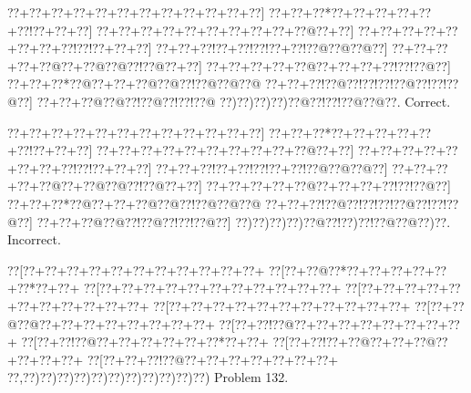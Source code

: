 \documentclass[a5paper]{article}
\begin{document}
\begin{center}
{\goo
\0??+\0??+\0??+\0??+\0??+\0??+\0??+\0??+\0??+\0??+\0??+\0??]
\0??+\0??+\0??*\0??+\0??+\0??+\0??+\0??+\0??!\0??+\0??+\0??]
\0??+\0??+\0??+\0??+\0??+\0??+\0??+\0??+\0??+\0??@\0??+\0??]
\0??+\0??+\0??+\0??+\0??+\0??+\0??+\0??!\0??!\0??+\0??+\0??]
\0??+\0??+\0??!\0??+\0??!\0??!\0??+\0??!\0??@\0??@\0??@\0??]
\0??+\0??+\0??+\0??+\0??@\0??+\0??@\0??@\0??!\0??@\0??+\0??]
\0??+\0??+\0??+\0??+\0??@\0??+\0??+\0??+\0??!\0??!\0??@\0??]
\0??+\0??+\0??*\0??@\0??+\0??+\0??@\0??@\0??!\0??@\0??@\0??@
\0??+\0??+\0??!\0??@\0??!\0??!\0??!\0??@\0??!\0??!\0??@\0??]
\0??+\0??+\0??@\0??@\0??!\0??@\0??!\0??!\0??@
\0??)\0??)\0??)\0??)\0??@\0??!\0??!\0??@\0??@\0??.
}
Correct. 

\end{center}
\begin{center}
{\goo
\0??+\0??+\0??+\0??+\0??+\0??+\0??+\0??+\0??+\0??+\0??+\0??]
\0??+\0??+\0??*\0??+\0??+\0??+\0??+\0??+\0??!\0??+\0??+\0??]
\0??+\0??+\0??+\0??+\0??+\0??+\0??+\0??+\0??+\0??@\0??+\0??]
\0??+\0??+\0??+\0??+\0??+\0??+\0??+\0??!\0??!\0??+\0??+\0??]
\0??+\0??+\0??!\0??+\0??!\0??!\0??+\0??!\0??@\0??@\0??@\0??]
\0??+\0??+\0??+\0??+\0??@\0??+\0??@\0??@\0??!\0??@\0??+\0??]
\0??+\0??+\0??+\0??+\0??@\0??+\0??+\0??+\0??!\0??!\0??@\0??]
\0??+\0??+\0??*\0??@\0??+\0??+\0??@\0??@\0??!\0??@\0??@\0??@
\0??+\0??+\0??!\0??@\0??!\0??!\0??!\0??@\0??!\0??!\0??@\0??]
\0??+\0??+\0??@\0??@\0??!\0??@\0??!\0??!\0??@\0??]
\0??)\0??)\0??)\0??)\0??@\0??!\0??)\0??!\0??@\0??@\0??)\0??.
}
Incorrect. 

\end{center}
\newpage
\begin{center}
{\goo
\0??[\0??+\0??+\0??+\0??+\0??+\0??+\0??+\0??+\0??+\0??+\0??+
\0??[\0??+\0??@\0??*\0??+\0??+\0??+\0??+\0??+\0??*\0??+\0??+
\0??[\0??+\0??+\0??+\0??+\0??+\0??+\0??+\0??+\0??+\0??+\0??+
\0??[\0??+\0??+\0??+\0??+\0??+\0??+\0??+\0??+\0??+\0??+\0??+
\0??[\0??+\0??+\0??+\0??+\0??+\0??+\0??+\0??+\0??+\0??+\0??+
\0??[\0??+\0??@\0??@\0??+\0??+\0??+\0??+\0??+\0??+\0??+\0??+
\0??[\0??+\0??!\0??@\0??+\0??+\0??+\0??+\0??+\0??+\0??+\0??+
\0??[\0??+\0??!\0??@\0??+\0??+\0??+\0??+\0??+\0??*\0??+\0??+
\0??[\0??+\0??!\0??+\0??@\0??+\0??+\0??@\0??+\0??+\0??+\0??+
\0??[\0??+\0??+\0??!\0??@\0??+\0??+\0??+\0??+\0??+\0??+\0??+
\0??,\0??)\0??)\0??)\0??)\0??)\0??)\0??)\0??)\0??)\0??)\0??)
}
Problem 132.

\end{center}
\end{document}
